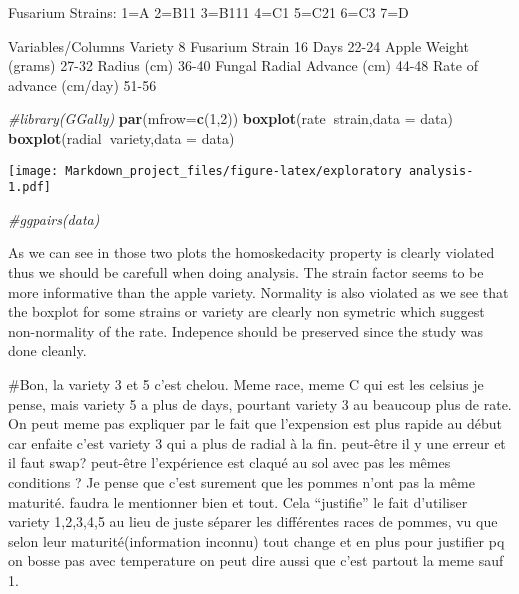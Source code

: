 \documentclass[
]{article}
\newenvironment{Shaded}{\begin{snugshade}}{\end{snugshade}}
\newcommand{\CommentTok}[1]{\textcolor[rgb]{0.56,0.35,0.01}{\textit{#1}}}
\newcommand{\DataTypeTok}[1]{\textcolor[rgb]{0.13,0.29,0.53}{#1}}
\newcommand{\DecValTok}[1]{\textcolor[rgb]{0.00,0.00,0.81}{#1}}
\newcommand{\KeywordTok}[1]{\textcolor[rgb]{0.13,0.29,0.53}{\textbf{#1}}}
\newcommand{\NormalTok}[1]{#1}
\newcommand{\OperatorTok}[1]{\textcolor[rgb]{0.81,0.36,0.00}{\textbf{#1}}}
\begin{document}
Fusarium Strains: 1=A 2=B11 3=B111 4=C1 5=C21 6=C3 7=D

Variables/Columns Variety 8 Fusarium Strain 16 Days 22-24 Apple Weight
(grams) 27-32 Radius (cm) 36-40 Fungal Radial Advance (cm) 44-48 Rate of
advance (cm/day) 51-56

\begin{Shaded}
\begin{Highlighting}[]
\CommentTok{#library(GGally)}
\KeywordTok{par}\NormalTok{(}\DataTypeTok{mfrow=}\KeywordTok{c}\NormalTok{(}\DecValTok{1}\NormalTok{,}\DecValTok{2}\NormalTok{))}
\KeywordTok{boxplot}\NormalTok{(rate}\OperatorTok{~}\NormalTok{strain,}\DataTypeTok{data =}\NormalTok{ data)}
\KeywordTok{boxplot}\NormalTok{(radial}\OperatorTok{~}\NormalTok{variety,}\DataTypeTok{data =}\NormalTok{ data)}
\end{Highlighting}
\end{Shaded}

\texttt{[image: Markdown\_project\_files/figure-latex/exploratory analysis-1.pdf]}

\begin{Shaded}
\begin{Highlighting}[]
\CommentTok{#ggpairs(data)}
\end{Highlighting}
\end{Shaded}

As we can see in those two plots the homoskedacity property is clearly
violated thus we should be carefull when doing analysis. The strain
factor seems to be more informative than the apple variety. Normality is
also violated as we see that the boxplot for some strains or variety are
clearly non symetric which suggest non-normality of the rate. Indepence
should be preserved since the study was done cleanly.

\#Bon, la variety 3 et 5 c'est chelou. Meme race, meme C qui est les
celsius je pense, mais variety 5 a plus de days, pourtant variety 3 au
beaucoup plus de rate. On peut meme pas expliquer par le fait que
l'expension est plus rapide au début car enfaite c'est variety 3 qui a
plus de radial à la fin. peut-être il y une erreur et il faut swap?
peut-être l'expérience est claqué au sol avec pas les mêmes conditions ?
Je pense que c'est surement que les pommes n'ont pas la même maturité.
faudra le mentionner bien et tout. Cela ``justifie'' le fait d'utiliser
variety 1,2,3,4,5 au lieu de juste séparer les différentes races de
pommes, vu que selon leur maturité(information inconnu) tout change et
en plus pour justifier pq on bosse pas avec temperature on peut dire
aussi que c'est partout la meme sauf 1.
\end{document}
